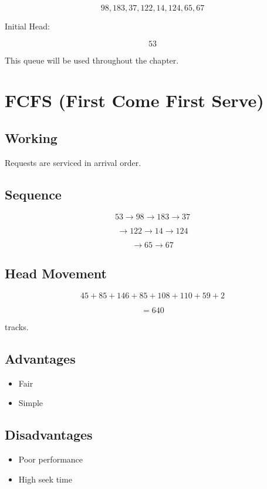 \[
98,183,37,122,14,124,65,67
\]

Initial Head:

\[
53
\]

This queue will be used throughout the chapter.

\section{FCFS (First Come First Serve)}

\subsection{Working}

Requests are serviced in arrival order.

\subsection{Sequence}

\[
53 \rightarrow 98 \rightarrow 183 \rightarrow 37
\]

\[
\rightarrow 122 \rightarrow 14 \rightarrow 124
\]

\[
\rightarrow 65 \rightarrow 67
\]

\subsection{Head Movement}

\[
45+85+146+85+108+110+59+2
\]

\[
=640
\]

tracks.

\subsection{Advantages}

\begin{itemize}
\item Fair
\item Simple
\end{itemize}

\subsection{Disadvantages}

\begin{itemize}
\item Poor performance
\item High seek time
\end{itemize}

